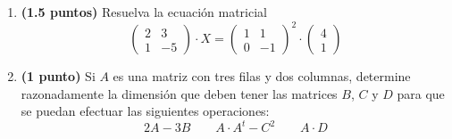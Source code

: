 
\begin{enumerate}[label=\alph*)]
\item \textbf{(1.5 puntos)} Resuelva la ecuación matricial
\[
\begin{pmatrix}2&3\\1&-5\end{pmatrix}\cdot X=\begin{pmatrix}1&1\\0&-1\end{pmatrix}^{2}\cdot\begin{pmatrix}4\\1\end{pmatrix}
\]
\item \textbf{(1 punto)} Si $A$ es una matriz con tres filas y dos columnas, determine razonadamente la dimensión que deben tener las matrices $B$, $C$ y $D$ para que se puedan efectuar las siguientes operaciones:
\[
2A-3B\qquad A\cdot A^t-C^2\qquad A\cdot D
\]
\end{enumerate}
